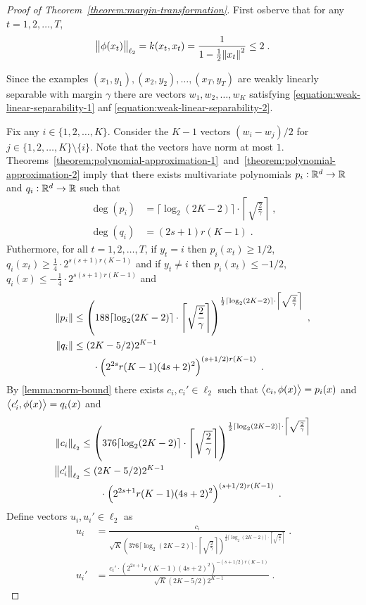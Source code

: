 \begin{proof}[Proof of Theorem~\ref{theorem:margin-transformation}]
First osberve that for any $t=1,2,\dots,T$,
$$
\norm{\phi(x_t)}_{\ell_2} = k(x_t,x_t) = \frac{1}{1 - \frac{1}{2} \norm{x_t}^2} \le 2 \; .
$$

Since the examples $(x_1, y_1), (x_2, y_2), \dots, (x_T, y_T)$ are weakly
linearly separable with margin $\gamma$ there are vectors $w_1, w_2, \dots, w_K$
satisfying \eqref{equation:weak-linear-separability-1} anf
\eqref{equation:weak-linear-separability-2}.

Fix any $i \in \{1,2,\dots,K\}$. Consider the $K-1$ vectors $(w_i - w_j)/2$ for
$j \in \{1,2,\dots,K\} \setminus \{i\}$. Note that the vectors have norm at most
$1$.
Theorems~\ref{theorem:polynomial-approximation-1}~and~\ref{theorem:polynomial-approximation-2}
imply that there exists multivariate polynomials $p_i:\mathbb{R}^d \to \mathbb{R}$ and $q_i:\mathbb{R}^d
\to \mathbb{R}$ such that
\begin{align*}
\deg(p_i) & = \lceil \log_2(2K-2) \rceil \cdot \left\lceil \sqrt{\frac{2}{\gamma}} \right\rceil \; , \\
\deg(q_i) & = (2s+1) r(K-1) \; .
\end{align*}
Futhermore, for all $t=1,2,\dots,T$, if $y_t = i$ then $p_i(x_t) \ge 1/2$,
$q_i(x_t) \ge \frac{1}{4} \cdot 2^{s(s+1)r(K-1)}$ and if $y_t \neq i$ then
$p_i(x_t) \le -1/2$, $q_i(x) \le - \frac{1}{4} \cdot 2^{s(s+1)r(K-1)}$ and
\begin{align*}
\norm{p_i} & \le \left(188 \lceil \log_2(2K-2) \rceil \cdot \left \lceil \sqrt{\frac{2}{\gamma}} \right \rceil \right)^{\frac{1}{2} \lceil \log_2(2K-2) \rceil
\cdot \left \lceil \sqrt{\frac{2}{\gamma}} \right \rceil} \; , \\
\norm{q_i} & \le (2K-5/2) 2^{K-1} \\
& \qquad \cdot \left(2^{2s} r(K-1) (4s+2)^2 \right)^{(s+1/2)r(K-1)} \; .
\end{align*}
By \autoref{lemma:norm-bound} there exists $c_i, c_i' \in \ell_2$ such that
$\left\langle c_i, \phi(x) \right\rangle = p_i(x)$ and $\left\langle c_i', \phi(x) \right\rangle = q_i(x)$ and
\begin{align*}
\norm{c_i}_{\ell_2}
& \le \left(376 \lceil \log_2(2K-2) \rceil \cdot \left \lceil \sqrt{\frac{2}{\gamma}} \right \rceil \right)^{\frac{1}{2} \lceil \log_2(2K-2) \rceil
\cdot \left \lceil \sqrt{\frac{2}{\gamma}} \right \rceil} \\
\norm{c'_i}_{\ell_2} & \le (2K-5/2) 2^{K-1} \\
& \qquad \cdot \left(2^{2s+1} r(K-1) (4s+2)^2 \right)^{(s+1/2)r(K-1)} \; .
\end{align*}
Define vectors $u_i, u_i' \in \ell_2$ as
\begin{align*}
u_i & = \frac{c_i}{\sqrt{K} \left(376 \lceil \log_2(2K-2) \rceil \cdot \left \lceil \sqrt{\frac{2}{\gamma}} \right \rceil \right)^{\frac{1}{2} \lceil \log_2(2K-2) \rceil
\cdot \left \lceil \sqrt{\frac{2}{\gamma}} \right \rceil}} \; . \\
u_i' & = \frac{c_i'  \cdot \left(2^{2s+1} r(K-1) (4s+2)^2 \right)^{-(s+1/2)r(K-1)}}{\sqrt{K} (2K-5/2) 2^{K-1}} \; .
\end{align*}


\end{proof}
